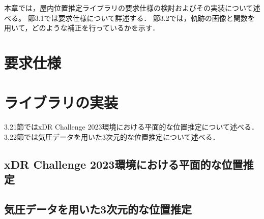 
\thispagestyle{myheadings}
本章では，屋内位置推定ライブラリの要求仕様の検討およびその実装について述べる。
節3.1では要求仕様について詳述する．
節3.2では，軌跡の画像と関数を用いて，どのような補正を行っているかを示す．


\section{要求仕様}



\section{ライブラリの実装}
3.21節ではxDR Challenge 2023環境における平面的な位置推定について述べる．
3.22節では気圧データを用いた3次元的な位置推定について述べる．

\subsection{xDR Challenge 2023環境における平面的な位置推定}









\subsection{気圧データを用いた3次元的な位置推定}



